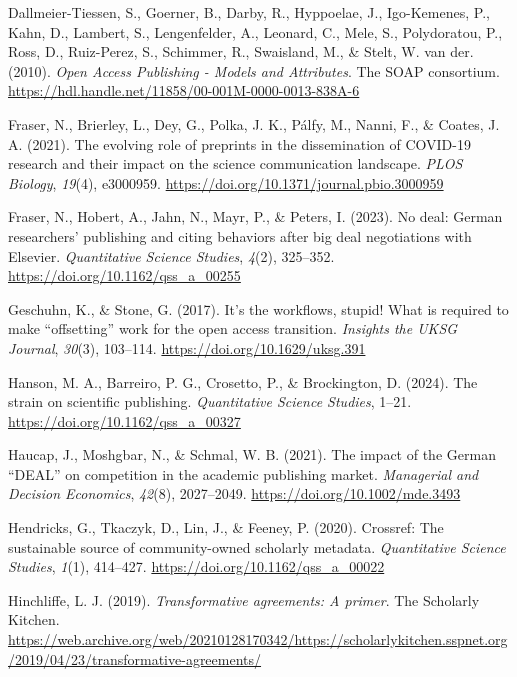 \documentclass[a4paper,man,floatsintext,longtable,noextraspace,12pt]{apa6}
\newlength{\cslhangindent}
\newenvironment{CSLReferences}[2] %
  {\begin{list}{}{%
   \setlength{\itemindent}{0pt}
   \setlength{\leftmargin}{0pt}
   \setlength{\parsep}{0pt}
   \ifodd #1
    \setlength{\leftmargin}{\cslhangindent}
    \setlength{\itemindent}{-1\cslhangindent}
   \fi
   \setlength{\itemsep}{#2\baselineskip}}}
  {\end{list}}
\begin{document}
\begin{CSLReferences}{1}{0}
Dallmeier-Tiessen, S., Goerner, B., Darby, R., Hyppoelae, J.,
Igo-Kemenes, P., Kahn, D., Lambert, S., Lengenfelder, A., Leonard, C.,
Mele, S., Polydoratou, P., Ross, D., Ruiz-Perez, S., Schimmer, R.,
Swaisland, M., \& Stelt, W. van der. (2010). \emph{{Open Access
Publishing - Models and Attributes}}. The SOAP consortium.
\url{https://hdl.handle.net/11858/00-001M-0000-0013-838A-6}

Fraser, N., Brierley, L., Dey, G., Polka, J. K., Pálfy, M., Nanni, F.,
\& Coates, J. A. (2021). The evolving role of preprints in the
dissemination of COVID-19 research and their impact on the science
communication landscape. \emph{PLOS Biology}, \emph{19}(4), e3000959.
\url{https://doi.org/10.1371/journal.pbio.3000959}

Fraser, N., Hobert, A., Jahn, N., Mayr, P., \& Peters, I. (2023). No
deal: German researchers' publishing and citing behaviors after big deal
negotiations with {Elsevier}. \emph{Quantitative Science Studies},
\emph{4}(2), 325--352. \url{https://doi.org/10.1162/qss_a_00255}

Geschuhn, K., \& Stone, G. (2017). It's the workflows, stupid! What is
required to make {``offsetting''} work for the open access transition.
\emph{Insights the {UKSG} Journal}, \emph{30}(3), 103--114.
\url{https://doi.org/10.1629/uksg.391}

Hanson, M. A., Barreiro, P. G., Crosetto, P., \& Brockington, D. (2024).
The strain on scientific publishing. \emph{Quantitative Science
Studies}, 1--21. \url{https://doi.org/10.1162/qss_a_00327}

Haucap, J., Moshgbar, N., \& Schmal, W. B. (2021). The impact of the
{German {``DEAL''}} on competition in the academic publishing market.
\emph{Managerial and Decision Economics}, \emph{42}(8), 2027--2049.
\url{https://doi.org/10.1002/mde.3493}

Hendricks, G., Tkaczyk, D., Lin, J., \& Feeney, P. (2020). Crossref: The
sustainable source of community-owned scholarly metadata.
\emph{Quantitative Science Studies}, \emph{1}(1), 414--427.
\url{https://doi.org/10.1162/qss_a_00022}

Hinchliffe, L. J. (2019). \emph{Transformative agreements: A primer}.
The Scholarly Kitchen.
\url{https://web.archive.org/web/20210128170342/https://scholarlykitchen.sspnet.org/2019/04/23/transformative-agreements/}


\end{CSLReferences}
\end{document}

